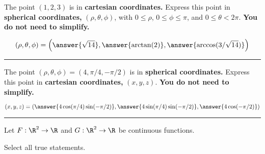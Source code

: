 \documentclass{ximera}
\begin{document}
\begin{problem}
  The point $(1,2,3)$ is in \textbf{cartesian coordinates.} Express
  this point in \textbf{spherical coordinates,} $(\rho,\theta,\phi)$,
  with $0\le \rho$, $0\le \phi \le \pi$, and $0\le \theta<
  2\pi$. \textbf{You do not need to simplify.}
  \begin{prompt}
    \[
    (\rho,\theta,\phi) = \left(\answer{\sqrt{14}},\answer{\arctan(2)},\answer{\arccos(3/\sqrt{14})}\right)
    \]
  \end{prompt}
\end{problem}

\vfill

\hrule

\begin{problem}
  The point $(\rho,\theta,\phi) = (4,\pi/4,-\pi/2)$ is in
  \textbf{spherical coordinates.} Express this point in
  \textbf{cartesian coordinates,} $(x,y,z)$. \textbf{You do not need
    to simplify.}
  \begin{prompt}
    \[
    (x,y,z) = \left(\answer{4\cos(\pi/4)\sin(-\pi/2)},\answer{4\sin(\pi/4)\sin(-\pi/2)},\answer{4\cos(-\pi/2)}\right)
    \]
  \end{prompt}
\end{problem}


\vfill

\hrule

\begin{problem}
  Let $F:\R^2\to\R$ and $G:\R^2\to\R$ be continuous functions.
  \begin{prompt}
    Select all true statements.
  \end{prompt}
  \begin{selectAll}
  \end{selectAll}
\end{problem}
\end{document}
